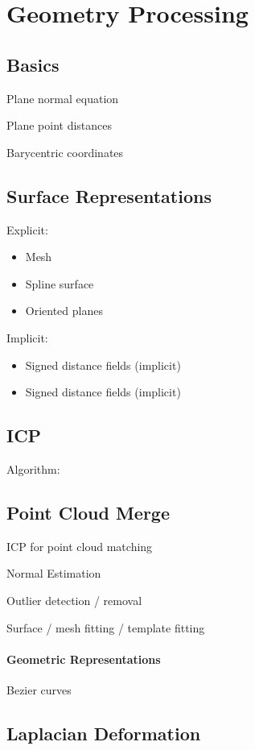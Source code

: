 \chapter{Geometry Processing} 

\section{Basics}

Plane normal equation

Plane point distances

Barycentric coordinates


\section{ Surface Representations}

Explicit:
\begin{itemize}
\item Mesh
\item Spline surface
\item Oriented planes
\end{itemize}

Implicit:
\begin{itemize}
\item Signed distance fields (implicit)
\item Signed distance fields (implicit)
\end{itemize}


\section{ICP}

Algorithm:

\section{Point Cloud Merge}

ICP for point cloud matching

Normal Estimation

Outlier detection / removal 

Surface / mesh fitting / template fitting

\subsubsection{Geometric Representations}

Bezier curves

\section{Laplacian Deformation}